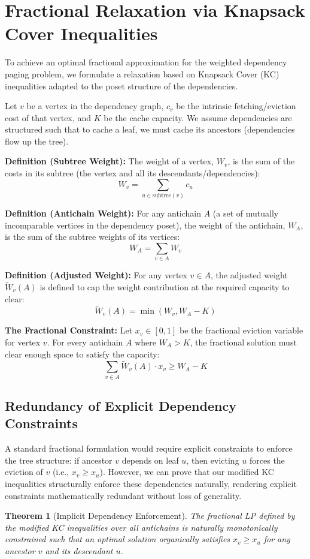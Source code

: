 \documentclass[a4paper]{article}
\newtheorem{theorem}{Theorem}    %
\begin{document}
\section{Fractional Relaxation via Knapsack Cover Inequalities}
To achieve an optimal fractional approximation for the weighted dependency paging problem, we formulate a relaxation based on Knapsack Cover (KC) inequalities adapted to the poset structure of the dependencies.

Let $v$ be a vertex in the dependency graph, $c_v$ be the intrinsic fetching/eviction cost of that vertex, and $K$ be the cache capacity. We assume dependencies are structured such that to cache a leaf, we must cache its ancestors (dependencies flow up the tree).

\noindent\textbf{Definition (Subtree Weight):} The weight of a vertex, $W_v$, is the sum of the costs in its subtree (the vertex and all its descendants/dependencies):
$$W_v = \sum_{u \in \text{subtree}(v)} c_u$$

\noindent\textbf{Definition (Antichain Weight):} For any antichain $A$ (a set of mutually incomparable vertices in the dependency poset), the weight of the antichain, $W_A$, is the sum of the subtree weights of its vertices:
$$W_A = \sum_{v \in A} W_v$$

\noindent\textbf{Definition (Adjusted Weight):} For any vertex $v \in A$, the adjusted weight $\widetilde{W}_v(A)$ is defined to cap the weight contribution at the required capacity to clear:
$$\widetilde{W}_v(A) = \min(W_v, W_A - K)$$

\noindent\textbf{The Fractional Constraint:} Let $x_v \in [0, 1]$ be the fractional eviction variable for vertex $v$. For every antichain $A$ where $W_A > K$, the fractional solution must clear enough space to satisfy the capacity:
$$\sum_{v \in A} \widetilde{W}_v(A) \cdot x_v \ge W_A - K$$

\subsection{Redundancy of Explicit Dependency Constraints}
A standard fractional formulation would require explicit constraints to enforce the tree structure: if ancestor $v$ depends on leaf $u$, then evicting $u$ forces the eviction of $v$ (i.e., $x_v \ge x_u$). However, we can prove that our modified KC inequalities structurally enforce these dependencies naturally, rendering explicit constraints mathematically redundant without loss of generality.

\begin{theorem}[Implicit Dependency Enforcement]
The fractional LP defined by the modified KC inequalities over all antichains is naturally monotonically constrained such that an optimal solution organically satisfies $x_v \ge x_u$ for any ancestor $v$ and its descendant $u$.
\end{theorem}
\end{document}
